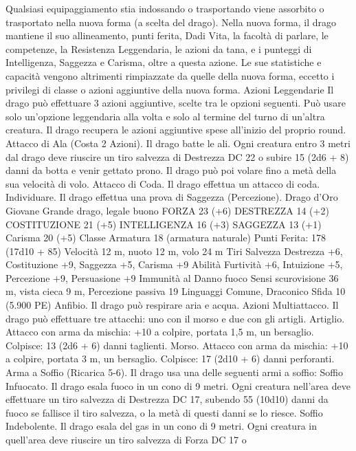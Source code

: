 \begin{multicols}{2}
Qualsiasi equipaggiamento stia indossando o trasportando viene
assorbito o trasportato nella nuova forma (a scelta del drago).
Nella nuova forma, il drago mantiene il suo allineamento, punti
ferita, Dadi Vita, la facoltà di parlare, le competenze, la Resistenza
Leggendaria, le azioni da tana, e i punteggi di Intelligenza, Saggezza
e Carisma, oltre a questa azione. Le sue statistiche e capacità
vengono altrimenti rimpiazzate da quelle della nuova forma, eccetto i
privilegi di classe o azioni aggiuntive della nuova forma.
Azioni Leggendarie
Il drago può effettuare 3 azioni aggiuntive, scelte tra le opzioni
seguenti. Può usare solo un’opzione leggendaria alla volta e solo
al termine del turno di un’altra creatura. Il drago recupera le
azioni aggiuntive spese all’inizio del proprio round.
Attacco di Ala (Costa 2 Azioni). Il drago batte le ali. Ogni
creatura entro 3 metri dal drago deve riuscire un tiro salvezza di
Destrezza DC 22 o subire 15 (2d6 + 8) danni da botta e venir
gettato prono. Il drago può poi volare fino a metà della sua
velocità di volo.
Attacco di Coda. Il drago effettua un attacco di coda.
Individuare. Il drago effettua una prova di Saggezza
(Percezione).
Drago d’Oro Giovane
Grande drago, legale buono
FORZA 23 (+6)
DESTREZZA 14 (+2)
COSTITUZIONE 21 (+5)
INTELLIGENZA 16 (+3)
SAGGEZZA 13 (+1)
Carisma 20 (+5)
Classe Armatura 18 (armatura naturale)
\hspace*{0pt}\hfill{Punti Ferita}: 178 (17d10 + 85)
Velocità 12 m, nuoto 12 m, volo 24 m
Tiri Salvezza Destrezza +6, Costituzione +9, Saggezza +5,
Carisma +9
Abilità Furtività +6, Intuizione +5, Percezione +9, Persuasione +9
Immunità al Danno fuoco
Sensi scurovisione 36 m, vista cieca 9 m, Percezione passiva 19
Linguaggi Comune, Draconico
Sfida 10 (5.900 PE)
Anfibio. Il drago può respirare aria e acqua.
Azioni
Multiattacco. Il drago può effettuare tre attacchi: uno con il
morso e due con gli artigli.
Artiglio. Attacco con arma da mischia: +10 a colpire, portata 1,5
m, un bersaglio.
Colpisce: 13 (2d6 + 6) danni taglienti.
Morso. Attacco con arma da mischia: +10 a colpire, portata 3 m,
un bersaglio.
Colpisce: 17 (2d10 + 6) danni perforanti.
Arma a Soffio (Ricarica 5-6). Il drago usa una delle seguenti armi
a soffio:
Soffio Infuocato. Il drago esala fuoco in un cono di 9 metri. Ogni
creatura nell’area deve effettuare un tiro salvezza di Destrezza DC
17, subendo 55 (10d10) danni da fuoco se fallisce il tiro salvezza, o
la metà di questi danni se lo riesce.
Soffio Indebolente. Il drago esala del gas in un cono di 9 metri. Ogni
creatura in quell’area deve riuscire un tiro salvezza di Forza DC 17 o

\end{multicols}
